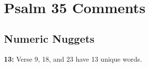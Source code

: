\section{Psalm 35 Comments}

\subsection{Numeric Nuggets}
\textbf{13: } Verse 9, 18, and 23 have 13 unique words.